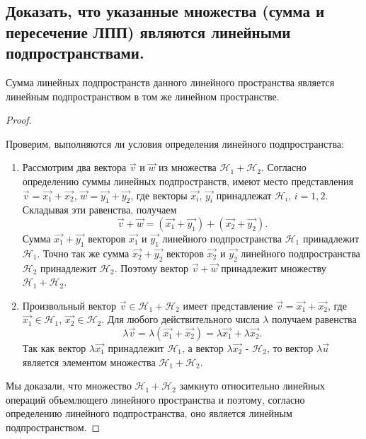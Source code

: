 \subsection{
    Доказать, что указанные множества (сумма и пересечение ЛПП) являются линейными подпространствами.
}

\begin{theorem}
    Сумма линейных подпространств данного линейного пространства является линейным подпространством в том же линейном пространстве.
\end{theorem}

\begin{proof}~

    Проверим, выполняются ли условия определения линейного подпространства:
    \begin{enumerate}[nosep]
        \item Рассмотрим два вектора $\vec{v}$ и $\vec{w}$ из множества $\mathcal{H}_1 + \mathcal{H}_2$. Согласно определению суммы линейных подпространств, имеют место представления $\vec{v} = \vec{x_1} + \vec{x_2}$, $\vec{w} = \vec{y_1} + \vec{y_2}$, где векторы $\vec{x_i}$, $\vec{y_i}$ принадлежат $\mathcal{H}_i$, $i = 1, 2$. Складывая эти равенства, получаем
        $$\vec{v} + \vec{w} = (\vec{x_1} + \vec{y_1}) + (\vec{x_2} + \vec{y_2}).$$
        Сумма $\vec{x_1} + \vec{y_1}$ векторов $\vec{x_1}$ и $\vec{y_1}$ линейного подпространства $\mathcal{H}_1$ принадлежит $\mathcal{H}_1$. Точно так же сумма $\vec{x_2} + \vec{y_2}$ векторов $\vec{x_2}$ и $\vec{y_2}$ линейного подпространства $\mathcal{H}_2$ принадлежит $\mathcal{H}_2$. Поэтому вектор $\vec{v} + \vec{w}$ принадлежит множеству $\mathcal{H}_1 + \mathcal{H}_2$.
        \item Произвольный вектор $\vec{v} \in \mathcal{H}_1 + \mathcal{H}_2$ имеет представление $\vec{v} = \vec{x_1} + \vec{x_2}$, где $\vec{x_1} \in \mathcal{H}_1$, $\vec{x_2} \in \mathcal{H}_2$. Для любого действительного числа $\lambda$ получаем равенства 
        $$\lambda \vec{v} = \lambda (\vec{x_1} + \vec{x_2}) = \lambda \vec{x_1} + \lambda \vec{x_2}.$$
        Так как вектор $\lambda \vec{x_1}$ принадлежит $\mathcal{H}_1$, а вектор $\lambda \vec{x_2}$ - $\mathcal{H}_2$, то вектор $\lambda \vec{u}$ является элементом множества $\mathcal{H}_1 + \mathcal{H}_2$.
    \end{enumerate}
    Мы доказали, что множество $\mathcal{H}_1 + \mathcal{H}_2$ замкнуто относительно линейных операций объемлющего линейного пространства и поэтому, согласно определению линейного подпространства, оно является линейным подпространством.
\end{proof}

